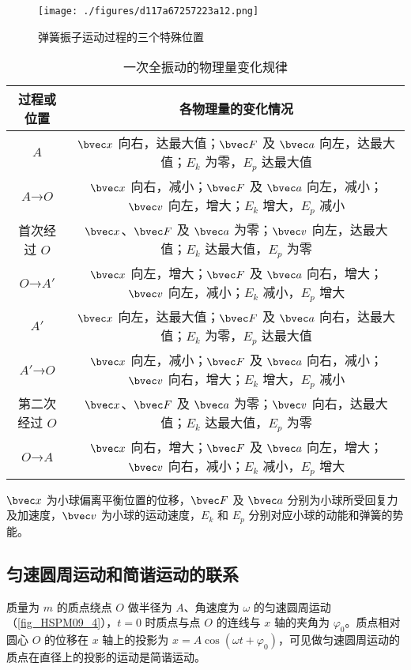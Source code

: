 \begin{figure}[ht]
\centering
\texttt{[image: ./figures/d117a67257223a12.png]}
\caption{弹簧振子运动过程的三个特殊位置} \label{fig_HSPM09_2}
\end{figure}

\begin{table}[ht]
\centering
\caption{一次全振动的物理量变化规律}\label{tab_HSPM09_1}
\begin{tabular}{|c|c|}
\hline
过程或位置 & 各物理量的变化情况 \\
\hline
$A$ & $\bvec x$ 向右，达最大值；$\bvec F$ 及 $\bvec a$ 向左，达最大值；$E_k$ 为零，$E_p$ 达最大值 \\
\hline
$A$→$O$ & $\bvec x$ 向右，减小；$\bvec F$ 及 $\bvec a$ 向左，减小；$\bvec v$ 向左，增大；$E_k$ 增大，$E_p$ 减小 \\
\hline
首次经过 $O$ & $\bvec x$、$\bvec F$ 及 $\bvec a$ 为零；$\bvec v$ 向左，达最大值；$E_k$ 达最大值，$E_p$ 为零 \\
\hline
$O$→$A'$ & $\bvec x$ 向左，增大；$\bvec F$ 及 $\bvec a$ 向右，增大；$\bvec v$ 向左，减小；$E_k$ 减小，$E_p$ 增大 \\
\hline
$A'$ & $\bvec x$ 向左，达最大值；$\bvec F$ 及 $\bvec a$ 向右，达最大值；$E_k$ 为零，$E_p$ 达最大值 \\
\hline
$A'$→$O$ & $\bvec x$ 向左，减小；$\bvec F$ 及 $\bvec a$ 向右，减小；$\bvec v$ 向右，增大；$E_k$ 增大，$E_p$ 减小 \\
\hline
第二次经过 $O$ & $\bvec x$、$\bvec F$ 及 $\bvec a$ 为零；$\bvec v$ 向右，达最大值；$E_k$ 达最大值，$E_p$ 为零 \\
\hline
$O$→$A$ & $\bvec x$ 向右，增大；$\bvec F$ 及 $\bvec a$ 向左，增大；$\bvec v$ 向右，减小；$E_k$ 减小，$E_p$ 增大 \\
\hline
\end{tabular}
\end{table}
$\bvec x$ 为小球偏离平衡位置的位移，$\bvec F$ 及 $\bvec a$ 分别为小球所受回复力及加速度，$\bvec v$ 为小球的运动速度，$E_k$ 和 $E_p$ 分别对应小球的动能和弹簧的势能。

\subsection{匀速圆周运动和简谐运动的联系}

质量为 $m$ 的质点绕点 $O$ 做半径为 $A$、角速度为 $\omega$ 的匀速圆周运动（\autoref{fig_HSPM09_4}），$t=0$ 时质点与点 $O$ 的连线与 $x$ 轴的夹角为 $\varphi_0$。质点相对圆心 $O$ 的位移在 $x$ 轴上的投影为 $x=A\cos(\omega t + \varphi_0)$，可见做匀速圆周运动的质点在直径上的投影的运动是简谐运动。

